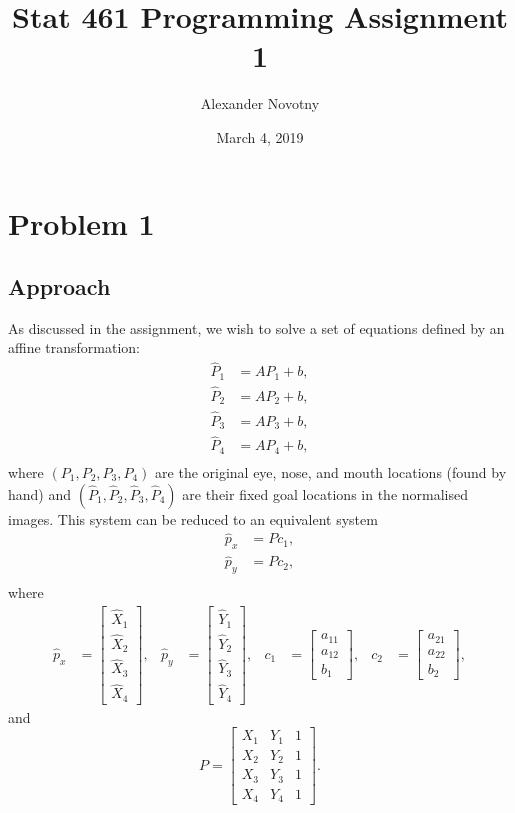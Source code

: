 \documentclass{article}
\title{Stat 461 Programming Assignment 1}
\date{March 4, 2019}
\author{Alexander Novotny}
\begin{document}

\maketitle

\section*{Problem 1}
\subsection*{Approach}
As discussed in the assignment, we wish to solve a set of equations defined by an affine transformation:
\begin{align*}
	\hat{P}_1 &= AP_1 + b,\\
	\hat{P}_2 &= AP_2 + b,\\
	\hat{P}_3 &= AP_3 + b,\\
	\hat{P}_4 &= AP_4 + b,\\
\end{align*}
where $(P_1, P_2, P_3, P_4)$ are the original eye, nose, and mouth locations (found by hand) and $(\hat{P}_1, \hat{P}_2, \hat{P}_3, \hat{P}_4)$ are their fixed goal locations in the normalised images. This system can be reduced to an equivalent system
\begin{align*}
	\hat{p}_x &= Pc_1,\\
	\hat{p}_y &= Pc_2,\\
\end{align*}
where
\begin{align*}
	\hat{p}_x &= \begin{bmatrix}\hat{X}_1\\\hat{X}_2\\\hat{X}_3\\\hat{X}_4\end{bmatrix}, &
	\hat{p}_y &= \begin{bmatrix}\hat{Y}_1\\\hat{Y}_2\\\hat{Y}_3\\\hat{Y}_4\end{bmatrix}, &
	c_1 &= \begin{bmatrix}a_{11}\\a_{12}\\b_1\end{bmatrix}, &
	c_2 &= \begin{bmatrix}a_{21}\\a_{22}\\b_2\end{bmatrix},
\end{align*}
and
\[
	P =
	\begin{bmatrix}
		X_1 & Y_1 & 1\\
		X_2 & Y_2 & 1\\
		X_3 & Y_3 & 1\\
		X_4 & Y_4 & 1
	\end{bmatrix}.
\]
\end{document}
